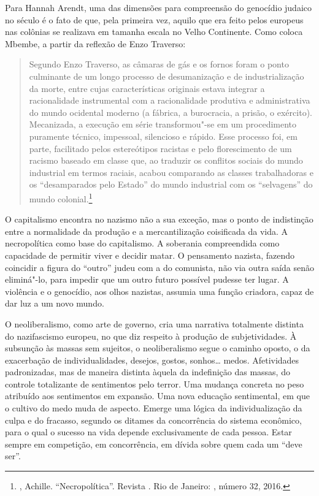 Para Hannah Arendt, uma das dimensões para compreensão do genocídio
judaico no século  é o fato de que, pela primeira vez, aquilo que era
feito pelos europeus nas colônias se realizava em tamanha escala no
Velho Continente. Como coloca Mbembe, a partir da reflexão de Enzo
Traverso:

\begin{quote}
Segundo Enzo Traverso, as câmaras de gás e os fornos foram o ponto
culminante de um longo processo de desumanização e de industrialização
da morte, entre cujas características originais estava integrar a
racionalidade instrumental com a racionalidade produtiva e
administrativa do mundo ocidental moderno (a fábrica, a burocracia, a
prisão, o exército). Mecanizada, a execução em série transformou"-se em
um procedimento puramente técnico, impessoal, silencioso e rápido. Esse
processo foi, em parte, facilitado pelos estereótipos racistas e pelo
florescimento de um racismo baseado em classe que, ao traduzir os
conflitos sociais do mundo industrial em termos raciais, acabou
comparando as classes trabalhadoras e os ``desamparados pelo Estado'' do
mundo industrial com os ``selvagens'' do mundo colonial.\footnote{,
  Achille. ``Necropolítica''. Revista {}. Rio de Janeiro:
  , número 32, 2016.}
\end{quote}

O capitalismo encontra no nazismo não a sua exceção, mas o ponto de
indistinção entre a normalidade da produção e a mercantilização
coisificada da vida. A necropolítica como base do capitalismo. A
soberania compreendida como capacidade de permitir viver e decidir
matar. O pensamento nazista, fazendo coincidir a figura do ``outro''
judeu com a do comunista, não via outra saída senão eliminá"-lo, para
impedir que um outro futuro possível pudesse ter lugar. A violência e o
genocídio, aos olhos nazistas, assumia uma função criadora, capaz de dar
luz a um novo mundo.

\asterisc

O neoliberalismo, como arte de governo, cria uma narrativa totalmente
distinta do nazifascismo europeu, no que diz respeito à produção de
subjetividades. À subsunção às massas sem sujeitos, o neoliberalismo
segue o caminho oposto, o da exacerbação de individualidades, desejos,
gostos, sonhos\ldots{} medos. Afetividades padronizadas, mas de maneira
distinta àquela da indefinição das massas, do controle totalizante de
sentimentos pelo terror. Uma mudança concreta no peso atribuído aos
sentimentos em expansão. Uma nova educação sentimental, em que o cultivo
do medo muda de aspecto. Emerge uma lógica da individualização da culpa
e do fracasso, segundo os ditames da concorrência do sistema econômico,
para o qual o sucesso na vida depende exclusivamente de cada pessoa.
Estar sempre em competição, em concorrência, em dívida sobre quem cada
um ``deve ser''.

